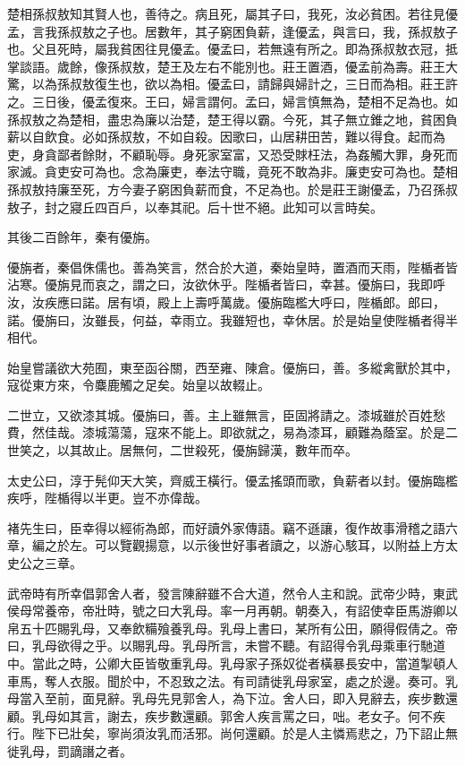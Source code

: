楚相孫叔敖知其賢人也，善待之。病且死，屬其子曰，我死，汝必貧困。若往見優孟，言我孫叔敖之子也。居數年，其子窮困負薪，逢優孟，與言曰，我，孫叔敖子也。父且死時，屬我貧困往見優孟。優孟曰，若無遠有所之。即為孫叔敖衣冠，抵掌談語。歲餘，像孫叔敖，楚王及左右不能別也。莊王置酒，優孟前為壽。莊王大驚，以為孫叔敖復生也，欲以為相。優孟曰，請歸與婦計之，三日而為相。莊王許之。三日後，優孟復來。王曰，婦言謂何。孟曰，婦言慎無為，楚相不足為也。如孫叔敖之為楚相，盡忠為廉以治楚，楚王得以霸。今死，其子無立錐之地，貧困負薪以自飲食。必如孫叔敖，不如自殺。因歌曰，山居耕田苦，難以得食。起而為吏，身貪鄙者餘財，不顧恥辱。身死家室富，又恐受賕枉法，為姦觸大罪，身死而家滅。貪吏安可為也。念為廉吏，奉法守職，竟死不敢為非。廉吏安可為也。楚相孫叔敖持廉至死，方今妻子窮困負薪而食，不足為也。於是莊王謝優孟，乃召孫叔敖子，封之寢丘四百戶，以奉其祀。后十世不絕。此知可以言時矣。

其後二百餘年，秦有優旃。

優旃者，秦倡侏儒也。善為笑言，然合於大道，秦始皇時，置酒而天雨，陛楯者皆沾寒。優旃見而哀之，謂之曰，汝欲休乎。陛楯者皆曰，幸甚。優旃曰，我即呼汝，汝疾應曰諾。居有頃，殿上上壽呼萬歲。優旃臨檻大呼曰，陛楯郎。郎曰，諾。優旃曰，汝雖長，何益，幸雨立。我雖短也，幸休居。於是始皇使陛楯者得半相代。

始皇嘗議欲大苑囿，東至函谷關，西至雍、陳倉。優旃曰，善。多縱禽獸於其中，寇從東方來，令麋鹿觸之足矣。始皇以故輟止。

二世立，又欲漆其城。優旃曰，善。主上雖無言，臣固將請之。漆城雖於百姓愁費，然佳哉。漆城蕩蕩，寇來不能上。即欲就之，易為漆耳，顧難為蔭室。於是二世笑之，以其故止。居無何，二世殺死，優旃歸漢，數年而卒。

太史公曰，淳于髡仰天大笑，齊威王橫行。優孟搖頭而歌，負薪者以封。優旃臨檻疾呼，陛楯得以半更。豈不亦偉哉。

褚先生曰，臣幸得以經術為郎，而好讀外家傳語。竊不遜讓，復作故事滑稽之語六章，編之於左。可以覽觀揚意，以示後世好事者讀之，以游心駭耳，以附益上方太史公之三章。

武帝時有所幸倡郭舍人者，發言陳辭雖不合大道，然令人主和說。武帝少時，東武侯母常養帝，帝壯時，號之曰大乳母。率一月再朝。朝奏入，有詔使幸臣馬游卿以帛五十匹賜乳母，又奉飲糒飱養乳母。乳母上書曰，某所有公田，願得假倩之。帝曰，乳母欲得之乎。以賜乳母。乳母所言，未嘗不聽。有詔得令乳母乘車行馳道中。當此之時，公卿大臣皆敬重乳母。乳母家子孫奴從者橫暴長安中，當道掣頓人車馬，奪人衣服。聞於中，不忍致之法。有司請徙乳母家室，處之於邊。奏可。乳母當入至前，面見辭。乳母先見郭舍人，為下泣。舍人曰，即入見辭去，疾步數還顧。乳母如其言，謝去，疾步數還顧。郭舍人疾言罵之曰，咄。老女子。何不疾行。陛下已壯矣，寧尚須汝乳而活邪。尚何還顧。於是人主憐焉悲之，乃下詔止無徙乳母，罰謫譖之者。


